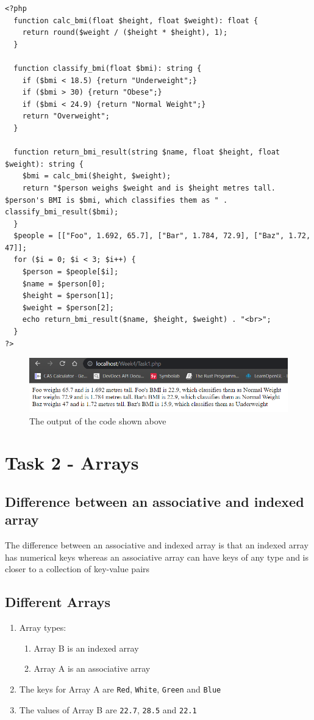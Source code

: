 \documentclass{article}
\begin{document}
            \begin{verbatim}
<?php
  function calc_bmi(float $height, float $weight): float {
    return round($weight / ($height * $height), 1);
  }
  
  function classify_bmi(float $bmi): string {
    if ($bmi < 18.5) {return "Underweight";}
    if ($bmi > 30) {return "Obese";}
    if ($bmi < 24.9) {return "Normal Weight";}
    return "Overweight";
  }

  function return_bmi_result(string $name, float $height, float $weight): string {
    $bmi = calc_bmi($height, $weight);
    return "$person weighs $weight and is $height metres tall. $person's BMI is $bmi, which classifies them as " . classify_bmi_result($bmi);
  }
  $people = [["Foo", 1.692, 65.7], ["Bar", 1.784, 72.9], ["Baz", 1.72, 47]];
  for ($i = 0; $i < 3; $i++) {
    $person = $people[$i];
    $name = $person[0];
    $height = $person[1];
    $weight = $person[2];
    echo return_bmi_result($name, $height, $weight) . "<br>";
  }
?>
            \end{verbatim}
            \begin{figure}[h]
                \centering
                \includegraphics[width=1.0\textwidth]{Task1B}
                \caption{The output of the code shown above}
            \end{figure}
    \section[Task 2]{Task 2 - Arrays}
        \subsection{Difference between an associative and indexed array}
            The difference between an associative and indexed array is that an indexed array has numerical keys whereas an associative array can have keys of any type and is closer to a collection of key-value pairs
        \subsection{Different Arrays}
            \begin{enumerate}
                \item Array types:
                \begin{enumerate}
                    \item Array B is an indexed array
                    \item Array A is an associative array
                \end{enumerate}
                \item The keys for Array A are \verb|Red|, \verb|White|, \verb|Green| and \verb|Blue|
                \item The values of Array B are \verb|22.7|, \verb|28.5| and \verb|22.1|
            \end{enumerate}
\end{document}
